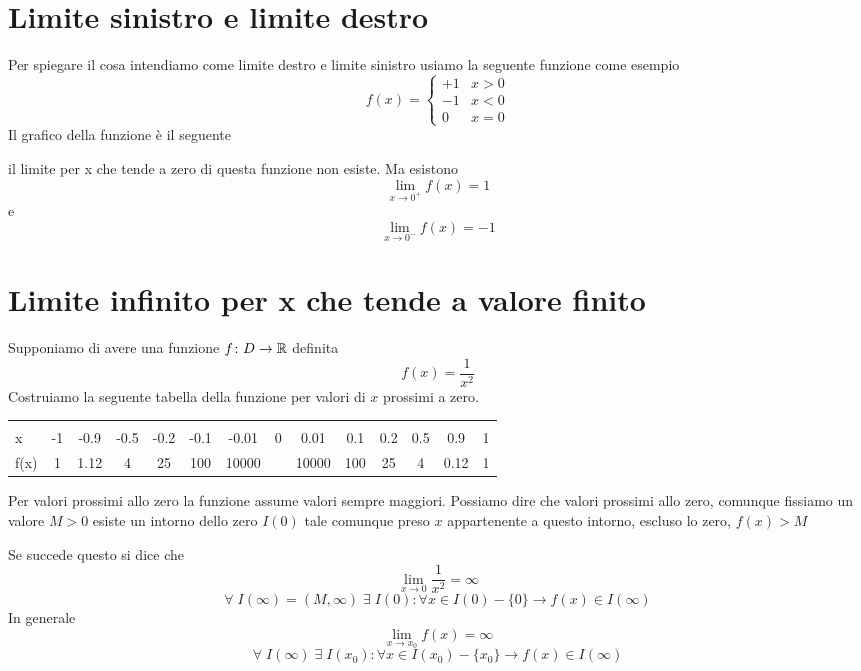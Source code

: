  \section{Limite sinistro e limite destro}
 Per spiegare il cosa intendiamo come limite destro e limite sinistro usiamo la seguente funzione come esempio\[ f(x)=\begin{cases}
 +1&x>0\\
 -1&x<0\\
 0&x=0
 \end{cases}\]
 Il grafico della funzione è il seguente
  \begin{center}
 	
 \end{center}
il limite per  x che tende a zero di questa funzione non esiste. Ma esistono \[\lim_{x\to 0^+}f(x)=1 \]
e \[\lim_{x\to 0^-}f(x)=-1 \]

\section{Limite infinito per x che tende a valore finito}
Supponiamo di avere una funzione $f\colon D\to{}\mathbb{R}$ definita \[f(x)=\dfrac{1}{x^2}\] Costruiamo la seguente tabella della funzione per valori di $x$ prossimi a zero.
\begin{center}
	\begin{tabular}{@{}L*{13}{c}}
		\toprule
		&&&&&	&&\\
		x& -1 & -0.9 & -0.5&-0.2&-0.1&-0.01&0&0.01&0.1&0.2&0.5&0.9&1 \\
		\cmidrule(r){2-14} 
	f(x)	&1&1.12&4&25&100&10000&&10000&100&25&4&0.12&1\\
		\bottomrule
	\end{tabular}
\end{center}
Per valori prossimi allo zero la funzione assume valori sempre maggiori. Possiamo dire che valori prossimi allo zero, comunque fissiamo un valore $M>0$ esiste un intorno dello zero $I(0)$ tale comunque preso $x$ appartenente a questo intorno, escluso lo zero, $f(x)>M$

Se succede questo si dice che \[\lim_{x\to 0}\dfrac{1}{x^2}=\infty \]
\begin{equation*}
\forall\; I(\infty)=(M,\infty)\; \exists\; I(0) : \forall x\in I(0)-\lbrace 0\rbrace \longrightarrow f(x)\in I(\infty)
\end{equation*}
In generale \begin{equation*}
\lim_{x\to x_0}f(x)=\infty
\end{equation*}
\begin{equation*}
\forall\; I(\infty)\; \exists\; I(x_0) : \forall x\in I(x_0)-\lbrace x_0\rbrace \longrightarrow f(x)\in I(\infty)
\end{equation*}
